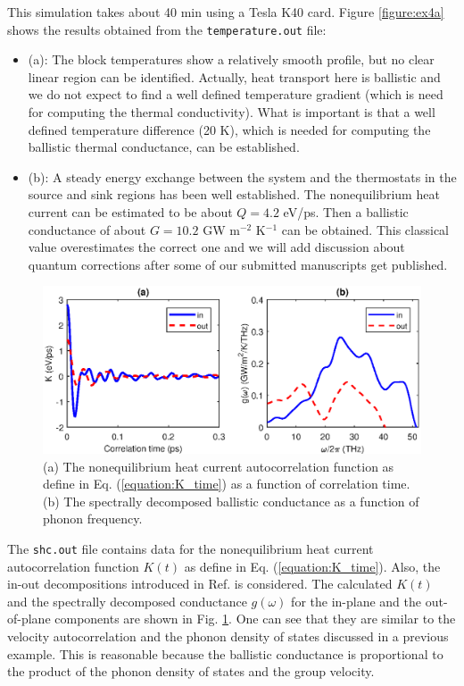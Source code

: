 \documentclass[12pt,a4paper]{report}
\begin{document}
This simulation takes about 40 min using a Tesla K40 card. Figure \ref{figure:ex4a} shows the results obtained from the \verb"temperature.out" file:
\begin{itemize}
\item (a): The block temperatures show a relatively smooth profile, but no clear linear region can be identified. Actually, heat transport here is ballistic and we do not expect to find a well defined temperature gradient (which is need for computing the thermal conductivity). What is important is that a well defined temperature difference (20 K), which is needed for computing the ballistic thermal conductance, can be established.
\item (b): A steady energy exchange between the system and the thermostats in the source and sink regions has been well established. The nonequilibrium heat current can be estimated to be about $Q=4.2$ eV/ps. Then a ballistic conductance of about $G=10.2$ GW m$^{-2}$ K$^{-1}$ can be obtained. This classical value overestimates the correct one and we will add discussion about quantum corrections after some of our submitted manuscripts get published.
\end{itemize}


\begin{figure}[h]
\begin{center}
\includegraphics[width=\columnwidth]{ex4b.eps}
\caption{(a) The nonequilibrium heat current autocorrelation function as define in Eq. (\ref{equation:K_time}) as a function of correlation time. (b) The spectrally decomposed ballistic conductance as a function of phonon frequency. }
\label{figure:ex4b}
\end{center}
\end{figure}


The \verb"shc.out" file contains data for the nonequilibrium heat current autocorrelation function $K(t)$ as define in Eq. (\ref{equation:K_time}). Also, the in-out decompositions introduced in Ref. \cite{fan2017prb} is considered. The calculated $K(t)$ and the spectrally decomposed conductance $g(\omega)$ for the in-plane and the out-of-plane components are shown in Fig. \ref{figure:ex4b}. One can see that they are similar to the velocity autocorrelation and the phonon density of states discussed in a previous example. This is reasonable because the ballistic conductance is proportional to the product of the phonon density of states and the group velocity.
\end{document}
